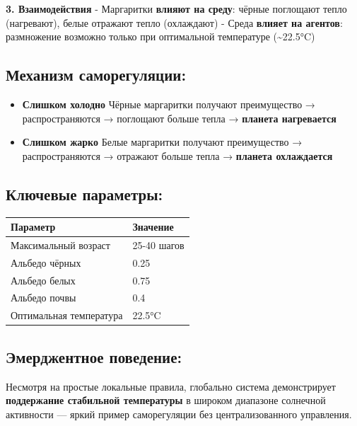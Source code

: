 \documentclass[
  12pt,
  a4paper,
  DIV=11,
  numbers=noendperiod]{scrreprt}
\begin{document}
\textbf{3. Взаимодействия} - Маргаритки \textbf{влияют на среду}: чёрные
поглощают тепло (нагревают), белые отражают тепло (охлаждают) - Среда
\textbf{влияет на агентов}: размножение возможно только при оптимальной
температуре (\textasciitilde22.5°C)

\subsection{Механизм
саморегуляции:}\label{ux43cux435ux445ux430ux43dux438ux437ux43c-ux441ux430ux43cux43eux440ux435ux433ux443ux43bux44fux446ux438ux438}

\begin{itemize}
\item
  \textbf{Слишком холодно} Чёрные маргаритки получают преимущество →
  распространяются → поглощают больше тепла → \textbf{планета
  нагревается}
\item
  \textbf{Слишком жарко} Белые маргаритки получают преимущество →
  распространяются → отражают больше тепла → \textbf{планета
  охлаждается} \textbar{}
\end{itemize}

\subsection{Ключевые
параметры:}\label{ux43aux43bux44eux447ux435ux432ux44bux435-ux43fux430ux440ux430ux43cux435ux442ux440ux44b}

\begin{longtable}[]{@{}ll@{}}
\toprule\noalign{}
Параметр & Значение \\
\midrule\noalign{}
\endhead
\bottomrule\noalign{}
\endlastfoot
Максимальный возраст & 25-40 шагов \\
Альбедо чёрных & 0.25 \\
Альбедо белых & 0.75 \\
Альбедо почвы & 0.4 \\
Оптимальная температура & 22.5°C \\
\end{longtable}

\subsection{Эмерджентное
поведение:}\label{ux44dux43cux435ux440ux434ux436ux435ux43dux442ux43dux43eux435-ux43fux43eux432ux435ux434ux435ux43dux438ux435}

Несмотря на простые локальные правила, глобально система демонстрирует
\textbf{поддержание стабильной температуры} в широком диапазоне
солнечной активности --- яркий пример саморегуляции без
централизованного управления.
\end{document}
